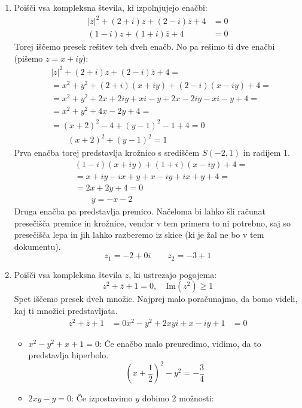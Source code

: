 \documentclass[12pt,a4paper,slovene]{article}
\begin{document}
\begin{enumerate}[(1)]
     
    \item Poišči vsa kompleksna števila, ki izpolnjujejo enačbi:
    \begin{align*}
    |z|^2 + (2 + i)z  + (2 - i)\overline{z} + 4 &= 0 \\
    (1-  i)z + (1 + i)\overline{z} + 4 &= 0    
    \end{align*} 
    Torej iščemo presek rešitev teh dveh enačb. No pa rešimo ti dve enačbi (pišemo $z = x + iy$):
    \begin{align*}
    &|z|^2 + (2 + i)z  + (2 - i)\overline{z} + 4 = \\
    &= x^2 + y^2 + (2 + i)(x + iy) + (2 - i)(x - iy) + 4 =\\
    &= x^2 + y^2 + 2x + 2iy + xi - y + 2x - 2iy - xi - y + 4 =\\
    &= x^2 + y^2 + 4x - 2y + 4 = \\
    &= (x + 2)^2 - 4 + (y - 1)^2 - 1 + 4 = 0\\
    &\qquad (x + 2)^2 + (y - 1)^2 = 1
    \end{align*} 
    Prva enačba torej predstavlja krožnico s središčem $S(-2, 1)$ in radijem 1.
    \begin{align*}
    &(1-  i)(x + iy) + (1 + i)(x - iy) + 4 =\\
    &= x + iy - ix  + y + x -iy + ix + y + 4 =\\
    &= 2x + 2y + 4 = 0\\
    &\qquad y = -x -2
    \end{align*} 
    Druga enačba pa predstavlja premico. Načeloma bi lahko šli računat presečišča premice in krožnice, vendar v tem primeru to ni potrebno, saj so presečišča lepa in jih lahko razberemo iz skice (ki je žal ne bo v tem dokumentu).
    \[
    z_1 = -2 + 0i\qquad z_2 = -3 + 1
    \]

    \item Poišči vsa kompleksna števila $z$, ki ustrezajo pogojema:
    \[
    z^2 + \overline{z} + 1 = 0, \quad \text{Im}(z^2) \geq 1
    \]
    Spet iščemo presek dveh množic. Najprej malo poračunajmo, da bomo videli, kaj ti množici predstavljata.
    \begin{align*}
    z^2 + \overline{z} + 1 &= 0
    x^2 - y^2 + 2xyi + x - iy + 1 &= 0
    \end{align*} 
    \begin{itemize}
        \item $x^2 - y^2 + x + 1 = 0$: Če enačbo malo preuredimo, vidimo, da to predstavlja hiperbolo.
        \[
        (x + \frac{1}{2})^2 - y^2 = -\frac{3}{4} 
        \]
        \item $2xy - y = 0$: Če izpostavimo $y$ dobimo 2 možnosti:
        

\end{itemize}
\end{enumerate}
\end{document}
